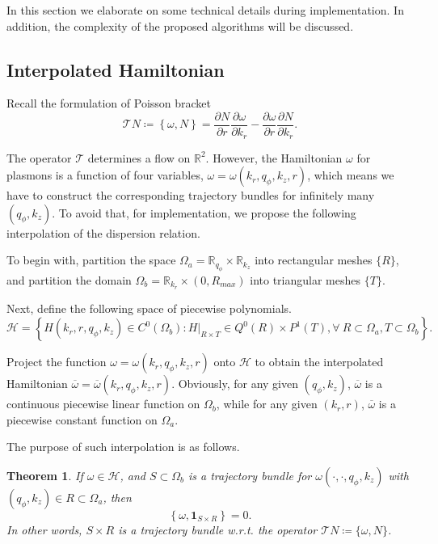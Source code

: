 \documentclass{article}
\newtheorem{theorem}{Theorem}
\numberwithin{equation}{section}
\begin{document}
In this section we elaborate on some technical details during implementation. In addition, the complexity of the proposed algorithms will be discussed.


\subsection{Interpolated Hamiltonian}
Recall the formulation of Poisson bracket
\begin{equation*}
    \mathcal{T}N \coloneqq \left\{ \omega,N\right\} =\frac{\partial N}{\partial r}\frac{\partial\omega}{\partial k_{r}} - \frac{\partial\omega}{\partial r}\frac{\partial N}{\partial k_{r}}.
\end{equation*}

The operator $\mathcal{T}$ determines a flow on $\mathbb{R}^{2}$. However, the Hamiltonian $\omega$ for plasmons is a function of four variables, $\omega = \omega(k_{r}, q_{\phi}, k_{z}, r)$, which means we have to construct the corresponding trajectory bundles for infinitely many $(q_{\phi}, k_{z})$. To avoid that, for implementation, we propose the following interpolation of the dispersion relation.

To begin with, partition the space $\Omega_{a} = \mathbb{R}_{q_{\phi}} \times \mathbb{R}_{k_{z}}$ into rectangular meshes $\{ R \}$, and partition the domain $\Omega_{b} = \mathbb{R}_{k_{r}} \times (0,R_{max})$ into triangular meshes $\{ T \}$.

Next, define the following space of piecewise polynomials.
\begin{equation*}
    \mathcal{H}=\left\{ H(k_{r},r,q_{\phi},k_{z})\in C^{0}(\Omega_{b}):H|_{R\times T}\in Q^{0}(R)\times P^{1}(T),\forall~R \subset \Omega_{a},T \subset \Omega_{b}\right\} .
\end{equation*}

Project the function $\omega = \omega(k_{r}, q_{\phi}, k_{z}, r)$ onto $\mathcal{H}$ to obtain the interpolated Hamiltonian $\overline{\omega} = \overline{\omega}(k_{r}, q_{\phi}, k_{z}, r)$. Obviously, for any given $(q_{\phi}, k_{z})$, $\overline{\omega}$ is a continuous piecewise linear function on $\Omega_{b}$, while for any given $(k_{r}, r)$, $\overline{\omega}$ is a piecewise constant function on $\Omega_{a}$. 

The purpose of such interpolation is as follows.
\begin{theorem}\label{thm_interpolate_traj}
    If $\omega \in \mathcal{H}$, and $S\subset \Omega_{b}$ is a trajectory bundle for $\omega(\cdot, \cdot, q_{\phi}, k_{z})$ with $(q_{\phi}, k_{z}) \in R \subset \Omega_{a}$, then
    \begin{equation*}
        \left\{ \omega,\mathbf{1}_{S\times R}\right\} =0.
    \end{equation*}
    In other words, $S \times R$ is a trajectory bundle w.r.t. the operator $\mathcal{T}N \coloneqq \{ \omega, N\}$.
\end{theorem}
\end{document}
